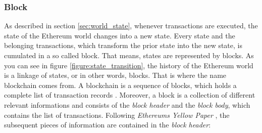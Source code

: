 \subsubsection{Block} 
\label{sec:block}
As described in section \ref{sec:world_state}, whenever transactions are executed, the state of the Ethereum world changes into a new state. Every state and the belonging transactions, which transform the prior state into the new state, is cumulated in a so called block. That means, states are represented by blocks. As you can see in figure \ref{figure:state_transition}, the history of the Ethereum world is a linkage of states, or in other words, blocks. That is where the name blockchain comes from. A blockchain is a sequence of blocks, which holds a complete list of transaction records \cite{zheng2017overview}. 
Moreover, a block is a collection of different relevant informations and consists of the \textit{block header} and the \textit{block body}, which contains the list of transactions. Following \textit{Ethereums Yellow Paper} \cite{wood2014ethereum}, the subsequent pieces of information are contained in the \textit{block header}:

